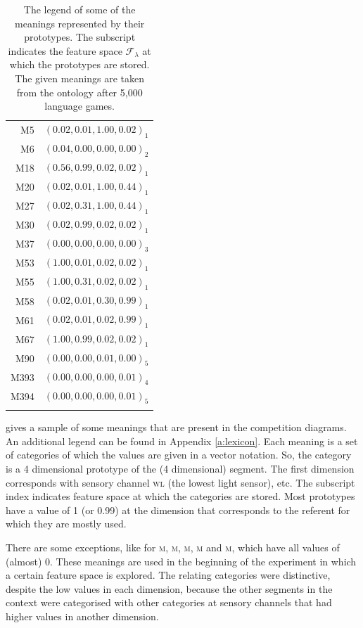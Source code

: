 \begin{table}
\centering
\begin{tabular}{rr}
\lsptoprule
M5 & $(0.02, 0.01, 1.00, 0.02)_1$\\%
M6 & $(0.04, 0.00, 0.00, 0.00)_2$\\%
M18 & $(0.56, 0.99, 0.02, 0.02)_1$\\%
M20 & $(0.02, 0.01, 1.00, 0.44)_1$\\%
M27 & $(0.02, 0.31, 1.00, 0.44)_1$\\%
M30 & $(0.02, 0.99, 0.02, 0.02)_1$\\%
M37 & $(0.00, 0.00, 0.00, 0.00)_3$\\%
M53 & $(1.00, 0.01, 0.02, 0.02)_1$\\%
M55 & $(1.00, 0.31, 0.02, 0.02)_1$\\%
M58 & $(0.02, 0.01, 0.30, 0.99)_1$\\%
M61 & $(0.02, 0.01, 0.02, 0.99)_1$\\%
M67 & $(1.00, 0.99, 0.02, 0.02)_1$\\%
M90 & $(0.00, 0.00, 0.01, 0.00)_5$\\%
M393 & $(0.00, 0.00, 0.00, 0.01)_4$\\%
M394 & $(0.00, 0.00, 0.00, 0.01)_5$\\%
\lspbottomrule
\end{tabular}
\caption{The legend of some of the meanings represented by their prototypes. The subscript indicates the feature space ${\mathcal F}_\lambda$ at which the prototypes are stored. The given meanings are taken from the ontology after 5,000 language games.}
\label{t:st:legend}
\end{table}


 gives a sample of some meanings that are present in the competition diagrams. An additional legend can be found in Appendix \ref{a:lexicon}. Each meaning is a set of categories of which the values are given in a vector notation. So, the category is a 4 dimensional prototype of the (4 dimensional) segment. The first dimension corresponds with sensory channel {\scshape wl} (the lowest light sensor), etc. The subscript index indicates feature space at which the categories are stored. Most prototypes have a value of 1 (or 0.99) at the dimension that corresponds to the referent for which they are mostly used. 

There are some exceptions, like for \textsc{m}, \textsc{m}, \textsc{m}, \textsc{m} and \textsc{m}, which have all values of (almost) 0. These meanings are used in the beginning of the experiment in which a certain feature space is explored. The relating categories were distinctive, despite the low values in each dimension, because the other segments in the context were categorised with other categories at sensory channels that had higher values in another dimension.


